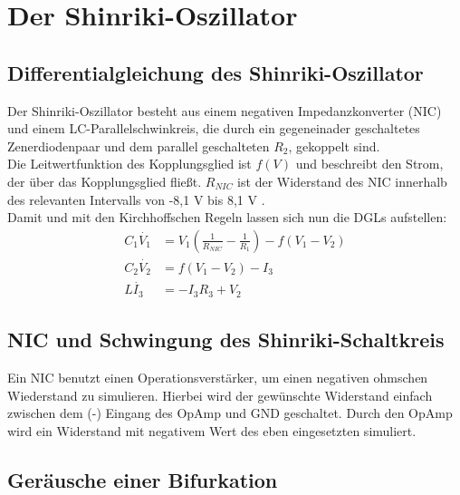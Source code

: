 

\section{Der Shinriki-Oszillator}
\label{sec:shinrikiOszi}

\subsection{Differentialgleichung des Shinriki-Oszillator}
\label{sub:dgl}

Der Shinriki-Oszillator besteht aus einem negativen Impedanzkonverter (NIC) und einem LC-Parallelschwinkreis, die durch ein gegeneinader geschaltetes Zenerdiodenpaar und dem parallel geschalteten \(R_2\), gekoppelt sind. \\
Die Leitwertfunktion des Kopplungsglied ist \( f(V)\) und beschreibt den Strom, der über das Kopplungsglied fließt.
\(R_{NIC}\) ist der Widerstand des NIC innerhalb des relevanten Intervalls von -8,1 V bis 8,1 V \citep[]{Lueck}.\\
Damit und mit den Kirchhoffschen Regeln lassen sich nun die DGLs aufstellen:
\begin{align}
    C_1 \dot{V_1} &= V_1 (\frac{1}{R_{NIC}}-\frac{1}{R_1}) - f(V_1-V_2) \\
    C_2 \dot{V_2} &= f(V_1-V_2) - I_3 \\
    L \dot{I_3} &= -I_3R_3 + V_2
\end{align}

\subsection{NIC und Schwingung des Shinriki-Schaltkreis}
\label{sub:nic}
Ein NIC benutzt einen Operationsverstärker, um einen negativen ohmschen Wiederstand zu simulieren. Hierbei wird der gewünschte Widerstand einfach zwischen dem (-) Eingang des OpAmp und GND geschaltet. Durch den OpAmp wird ein Widerstand mit negativem Wert des eben eingesetzten simuliert.

\subsection{Geräusche einer Bifurkation}
\label{sub:tonBifurkation}